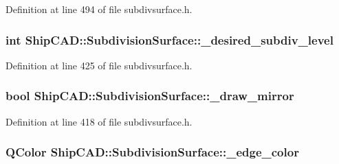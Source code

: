 Definition at line 494 of file subdivsurface.\+h.

\subsubsection[{\texorpdfstring{\+\_\+desired\+\_\+subdiv\+\_\+level}{_desired_subdiv_level}}]{\setlength{\rightskip}{0pt plus 5cm}int Ship\+C\+A\+D\+::\+Subdivision\+Surface\+::\+\_\+desired\+\_\+subdiv\+\_\+level\hspace{0.3cm}{\ttfamily [protected]}}\hypertarget{classShipCAD_1_1SubdivisionSurface_aeec20f09be87e6d57d88f903853ca96f}{}\label{classShipCAD_1_1SubdivisionSurface_aeec20f09be87e6d57d88f903853ca96f}


Definition at line 425 of file subdivsurface.\+h.

\subsubsection[{\texorpdfstring{\+\_\+draw\+\_\+mirror}{_draw_mirror}}]{\setlength{\rightskip}{0pt plus 5cm}bool Ship\+C\+A\+D\+::\+Subdivision\+Surface\+::\+\_\+draw\+\_\+mirror\hspace{0.3cm}{\ttfamily [protected]}}\hypertarget{classShipCAD_1_1SubdivisionSurface_a4ee73ae98bddfe1819419afd1d5ba029}{}\label{classShipCAD_1_1SubdivisionSurface_a4ee73ae98bddfe1819419afd1d5ba029}


Definition at line 418 of file subdivsurface.\+h.

\subsubsection[{\texorpdfstring{\+\_\+edge\+\_\+color}{_edge_color}}]{\setlength{\rightskip}{0pt plus 5cm}Q\+Color Ship\+C\+A\+D\+::\+Subdivision\+Surface\+::\+\_\+edge\+\_\+color\hspace{0.3cm}{\ttfamily [protected]}}\hypertarget{classShipCAD_1_1SubdivisionSurface_aced3b075062f92e55b3a89729cad3fd2}{}\label{classShipCAD_1_1SubdivisionSurface_aced3b075062f92e55b3a89729cad3fd2}


